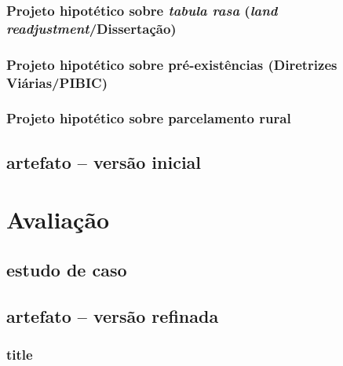 \documentclass[12pt, a4paper]{book} %
\begin{document}
            \section{Projeto hipotético sobre \textit{tabula rasa} (\textit{land readjustment}/Dissertação)}
            \section{Projeto hipotético sobre pré-existências (Diretrizes Viárias/PIBIC)}
            \section{Projeto hipotético sobre parcelamento rural}

        \chapter[Diretrizes projetuais]{artefato – versão inicial}

    \part[Avaliação]{Avaliação}

        \chapter[Comparativo com existente]{estudo de caso}

        \chapter[Grupos focais e \textit{feedback}]{}

        \chapter[Diretrizes projetuais]{artefato – versão refinada}

            \section[Comunicação do artefato aos \textit{stakeholders}]{title}


    \part*{}
\end{document}
